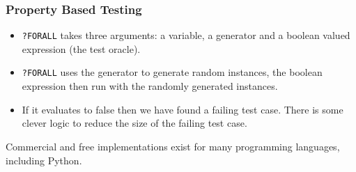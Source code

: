 \documentclass{beamer}
\begin{document}
\begin{frame}
  \frametitle{Property Based Testing}
  \begin{itemize}
  \item   {\tt ?FORALL} takes three arguments: a variable, a generator and a boolean
  valued expression (the test oracle).

\item {\tt ?FORALL} uses the generator to generate random instances, the
  boolean expression then run with the randomly generated instances.

\item If it evaluates to false then we have found a failing test case. There
  is some clever logic to reduce the size of the failing test case.
\end{itemize}
Commercial and free implementations exist for many programming languages,
including Python.

\end{frame}
\end{document}

